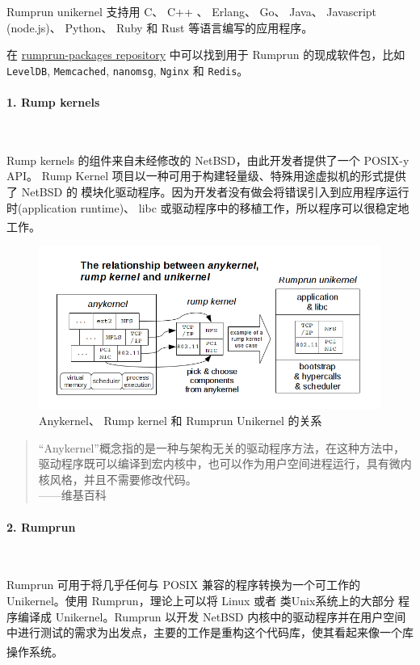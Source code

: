 \documentclass[UTF8,fontset=none,linespread=1.15]{ctexart}
\let\nosupcite\cite
\renewcommand*{\cite}[1]{\textsuperscript{\nosupcite{#1}}}
\begin{document}
Rumprun unikernel 支持用 C、 C++ 、 Erlang、 Go、
Java、 Javascript (node.js)、 Python、 Ruby 和 Rust 等语言编写的应用程序。

在 \href{https://github.com/rumpkernel/rumprun-packages}{rumprun-packages repository}
中可以找到用于 Rumprun 的现成软件包，比如 \texttt{LevelDB},
\texttt{Memcached}, \texttt{nanomsg}, \texttt{Nginx} 和 \texttt{Redis}。

\paragraph{1. Rump kernels}~

Rump kernels 的组件来自未经修改的 NetBSD，由此开发者提供了一个 POSIX-y API。
Rump Kernel 项目以一种可用于构建轻量级、特殊用途虚拟机的形式提供了 NetBSD 的
模块化驱动程序。因为开发者没有做会将错误引入到应用程序运行时(application runtime)、
libc 或驱动程序中的移植工作，所以程序可以很稳定地工作。\cite{bib:21-rump-kernel}
\begin{figure}[!hbt]
\includegraphics[width=\linewidth]{pictures/rumprun-1.png}
\caption{Anykernel、
Rump kernel 和 Rumprun Unikernel 的关系}
\end{figure}

\begin{quote}
“Anykernel”概念指的是一种与架构无关的驱动程序方法，在这种方法中，驱动程序既可以编译到宏内核中，也可以作为用户空间进程运行，具有微内核风格，并且不需要修改代码。\\
\hspace*{\fill}——维基百科
\end{quote}

\paragraph{2. Rumprun}~

Rumprun 可用于将几乎任何与 POSIX 兼容的程序转换为一个可工作的
Unikernel。使用 Rumprun，理论上可以将 Linux 或者 类Unix系统上的大部分
程序编译成 Unikernel。Rumprun 以开发 NetBSD 内核中的驱动程序并在用户空间
中进行测试的需求为出发点，主要的工作是重构这个代码库，使其看起来像一个库操作系统。\cite{bib:24-rumrun}
\end{document}
